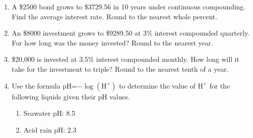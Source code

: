 \begin{enumerate}
\item A \$2500 bond grows to \$3729.56 in 10 years under continuous compounding.  Find the average interest rate.  Round to the nearest whole percent.\vfill


\item An \$8000 investment grows to \$9289.50 at 3\% interest compounded quarterly.  For how long was the money invested?  Round to the nearest year.\vfill

\newpage

\item \$20,000 is invested at 3.5\% interest compounded monthly.  How long will it take for the investment to triple?  Round to the nearest tenth of a year.\vfill
\vfill
\vfill

\item Use the formula pH=$-\log(\text{H}^+)$ to determine the value of $\text{H}^+$ for the following liquids given their pH values.
\begin{enumerate}
\item Seawater pH:  8.5 \vfill
\item Acid rain pH:  2.3\vfill
\end{enumerate}

%
%


\end{enumerate}

